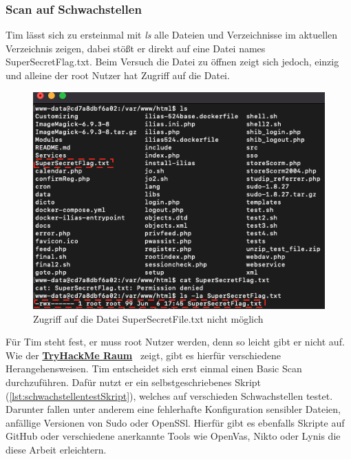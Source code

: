 \documentclass[10pt, a4paper,onecolumn ,titlepage]{article}
\begin{document}
    \subsubsection{Scan auf Schwachstellen}
    \label{subsubsec:scanSchwachstellen}
    Tim lässt sich zu ersteinmal mit \textit{ls} alle Dateien und Verzeichnisse im aktuellen Verzeichnis zeigen, dabei stößt er direkt auf eine Datei names SuperSecretFlag.txt.
    Beim Versuch die Datei zu öffnen zeigt sich jedoch, einzig und alleine der root Nutzer hat Zugriff auf die Datei.

    \begin{figure}[H]
        \centering
        \includegraphics[width=1\textwidth]{storyline_bilder_vm2/FileDenied}
        \caption{Zugriff auf die Datei SuperSecretFile.txt nicht möglich}
        \label{fig:fileDenied}
    \end{figure}
    \noindent
    Für Tim steht fest, er muss root Nutzer werden, denn so leicht gibt er nicht auf.
    Wie der \href{https://tryhackme.com/jr/t1mth3h4ck3rb0y}{\textbf{TryHackMe Raum}}~\parencite{privilegeEscalationRaumTryHackMe} zeigt, gibt es hierfür verschiedene Herangehensweisen.
    Tim entscheidet sich erst einmal einen Basic Scan durchzuführen.
    Dafür nutzt er ein selbstgeschriebenes Skript (\ref{lst:schwachstellentestSkript}), welches auf verschieden Schwachstellen testet.
    Darunter fallen unter anderem eine fehlerhafte Konfiguration sensibler Dateien, anfällige Versionen von Sudo oder OpenSSl.
    Hierfür gibt es ebenfalls Skripte auf GitHub oder verschiedene anerkannte Tools wie OpenVas, Nikto oder Lynis die diese Arbeit erleichtern.
    \\
\end{document}
